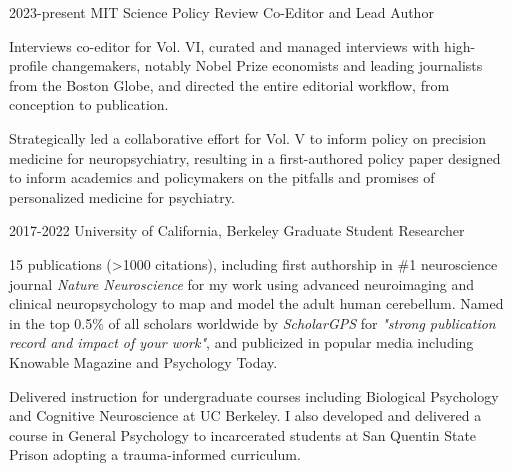 \begin{cventries}
  \cventry 
    {2023-present} %
    {MIT Science Policy Review}
    {Co-Editor and Lead Author} %
    {} %
    {
      \begin{cvitems} %
        \item{Interviews co-editor for Vol. VI, curated and managed interviews with high-profile changemakers, notably Nobel Prize economists and leading journalists from the Boston Globe, and directed the entire editorial workflow, from conception to publication.}
        \item {Strategically led a collaborative effort for Vol. V to inform policy on precision medicine for neuropsychiatry, resulting in a first-authored policy paper designed to inform academics and policymakers on the pitfalls and promises of personalized medicine for psychiatry.}
      \end{cvitems}
    }
    
  \cventry
    {2017-2022}
    {University of California, Berkeley} %
    {Graduate Student Researcher}
    {} %
    {
      \begin{cvitems} 
        \item {15 publications (>1000 citations), including first authorship in \#1 neuroscience journal \textit{Nature Neuroscience} for my work using advanced neuroimaging and clinical neuropsychology to map and model the adult human cerebellum. Named in the top 0.5\% of all scholars worldwide by \textit{ScholarGPS} for \textit{"strong publication record and impact of your work"}, and publicized in popular media including Knowable Magazine and Psychology Today.}  
        \item {Delivered instruction for undergraduate courses including Biological Psychology and Cognitive Neuroscience at UC Berkeley. I also developed and delivered a course in General Psychology to incarcerated students at San Quentin State Prison adopting a trauma-informed curriculum.}
		\end{cvitems}
    }

\end{cventries}



